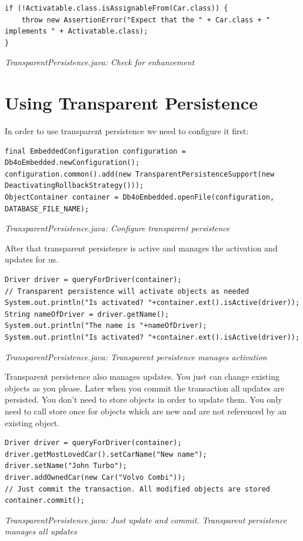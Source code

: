 \begin{lstlisting}
if (!Activatable.class.isAssignableFrom(Car.class)) {
    throw new AssertionError("Expect that the " + Car.class + " implements " + Activatable.class);
}
\end{lstlisting}

{\small\itshape TransparentPersistence.java: Check for enhancement\par}
\medskip

\section{Using Transparent Persistence}
\label{tut:transparentpersistence:usingit}

In order to use transparent persistence we need to configure it first:

\begin{lstlisting}
final EmbeddedConfiguration configuration = Db4oEmbedded.newConfiguration();
configuration.common().add(new TransparentPersistenceSupport(new DeactivatingRollbackStrategy()));
ObjectContainer container = Db4oEmbedded.openFile(configuration, DATABASE_FILE_NAME);
\end{lstlisting}

{\small\itshape TransparentPersistence.java: Configure transparent persistence\par}
\medskip

After that transparent persistence is active and manages the activation and updates for us.

\begin{lstlisting}
Driver driver = queryForDriver(container);
// Transparent persistence will activate objects as needed
System.out.println("Is activated? "+container.ext().isActive(driver));
String nameOfDriver = driver.getName();
System.out.println("The name is "+nameOfDriver);
System.out.println("Is activated? "+container.ext().isActive(driver));
\end{lstlisting}

{\small\itshape TransparentPersistence.java: Transparent persistence manages activation\par}
\medskip

Transparent persistence also manages updates. You just can change existing objects as you please. Later when you commit the transaction all updates are persisted. You don't need to store objects in order to update them. You only need to call store once for objects which are new and are not referenced by an existing object.

\begin{lstlisting}
Driver driver = queryForDriver(container);
driver.getMostLovedCar().setCarName("New name");
driver.setName("John Turbo");
driver.addOwnedCar(new Car("Volvo Combi"));
// Just commit the transaction. All modified objects are stored
container.commit();
\end{lstlisting}

{\small\itshape TransparentPersistence.java: Just update and commit. Transparent persistence manages all updates\par}
\medskip

